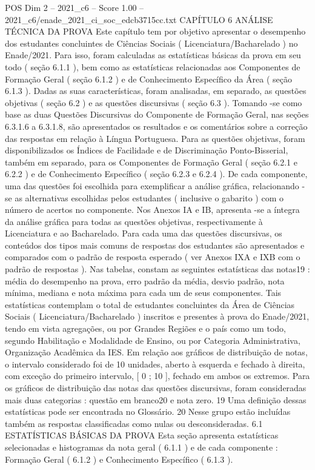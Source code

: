 \begin{textsample}{POS Dim 2 – 2021\_c6 – Score 1.00 – 2021\_c6/enade\_2021\_ci\_soc\_edcb3715cc.txt}  \label{ex:f2_pos_179}
CAPÍTULO 6 ANÁLISE TÉCNICA DA PROVA Este capítulo tem por objetivo apresentar o desempenho dos estudantes concluintes de Ciências Sociais ( Licenciatura/Bacharelado ) no Enade/2021.
Para isso, foram calculadas as estatísticas básicas da prova em seu todo ( seção 6.1.1 ), bem como as estatísticas relacionadas aos Componentes de Formação Geral ( seção 6.1.2 ) e de Conhecimento Específico da Área ( seção 6.1.3 ).
Dadas as suas características, foram analisadas, em separado, as questões objetivas ( seção 6.2 ) e as questões discursivas ( seção 6.3 ).
Tomando -se como base as duas Questões Discursivas do Componente de Formação Geral, nas seções 6.3.1.6 a 6.3.1.8, são apresentados os resultados e os comentários sobre a correção das respostas em relação à Língua Portuguesa.
Para as questões objetivas, foram disponibilizados os Índices de Facilidade e de Discriminação Ponto-Bisserial, também em separado, para os Componentes de Formação Geral ( seção 6.2.1 e 6.2.2 ) e de Conhecimento Específico ( seção 6.2.3 e 6.2.4 ).
De cada componente, uma das questões foi escolhida para exemplificar a análise gráfica, relacionando -se as alternativas escolhidas pelos estudantes ( inclusive o gabarito ) com o número de acertos no componente.
Nos Anexos IA e IB, apresenta -se a íntegra da análise gráfica para todas as questões objetivas, respectivamente à Licenciatura e ao Bacharelado.
Para cada uma das questões discursivas, os conteúdos dos tipos mais comuns de respostas dos estudantes são apresentados e comparados com o padrão de resposta esperado ( ver Anexos IXA e IXB com o padrão de respostas ).
Nas tabelas, constam as seguintes estatísticas das notas19 : média do desempenho na prova, erro padrão da média, desvio padrão, nota mínima, mediana e nota máxima para cada um de seus componentes.
Tais estatísticas contemplam o total de estudantes concluintes da Área de Ciências Sociais ( Licenciatura/Bacharelado ) inscritos e presentes à prova do Enade/2021, tendo em vista agregações, ou por Grandes Regiões e o país como um todo, segundo Habilitação e Modalidade de Ensino, ou por Categoria Administrativa, Organização Acadêmica da IES.
Em relação aos gráficos de distribuição de notas, o intervalo considerado foi de 10 unidades, aberto à esquerda e fechado à direita, com exceção do primeiro intervalo, [ 0 ; 10 ], fechado em ambos os extremos.
Para os gráficos de distribuição das notas das questões discursivas, foram consideradas mais duas categorias : questão em branco20 e nota zero. 19 Uma definição dessas estatísticas pode ser encontrada no Glossário. 20 Nesse grupo estão incluídas também as respostas classificadas como nulas ou desconsideradas. 6.1 ESTATÍSTICAS BÁSICAS DA PROVA Esta seção apresenta estatísticas selecionadas e histogramas da nota geral ( 6.1.1 ) e de cada componente : Formação Geral ( 6.1.2 ) e Conhecimento Específico ( 6.1.3 ).

\end{textsample}
